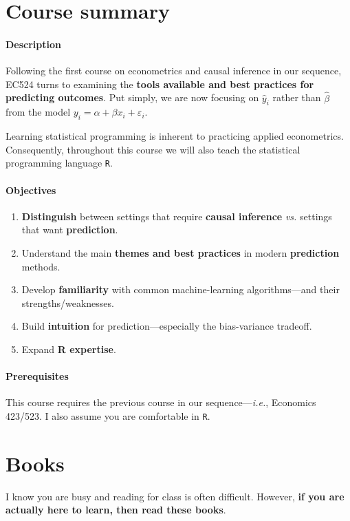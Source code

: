 \documentclass[10pt]{article}
\newcommand{\emf}[1]{\textbf{\textcolor{grass_green}{#1}}}
\begin{document}
\newpage

\section*{Course summary}

\paragraph{Description} Following the first course on econometrics and causal inference in our sequence, EC524 turns to examining the \emf{tools available and best practices for predicting outcomes}. Put simply, we are now focusing on $\hat{y}_i$ rather than $\hat{\beta}$ from the model $y_i = \alpha + \beta x_i + \varepsilon_i$.

Learning statistical programming is inherent to practicing applied econometrics. Consequently, throughout this course we will also teach the statistical programming language \texttt{R}.

\paragraph{Objectives}

\begin{enumerate}
  \item \emf{Distinguish} between settings that require \emf{causal inference} \textit{vs.} settings that want \emf{prediction}.
  \item Understand the main \emf{themes and best practices} in modern \emf{prediction} methods.
  \item Develop \emf{familiarity} with common machine-learning algorithms---and their strengths/weaknesses.
  \item Build \emf{intuition} for prediction---especially the bias-variance tradeoff.
  \item Expand \emf{R expertise}.
\end{enumerate}

\paragraph{Prerequisites} This course requires the previous course in our sequence---\textit{i.e.}, Economics 423/523. I also assume you are comfortable in \texttt{R}.

\section*{Books} I know you are busy and reading for class is often difficult. However, \emf{if you are actually here to learn, then read these books}.
\end{document}
